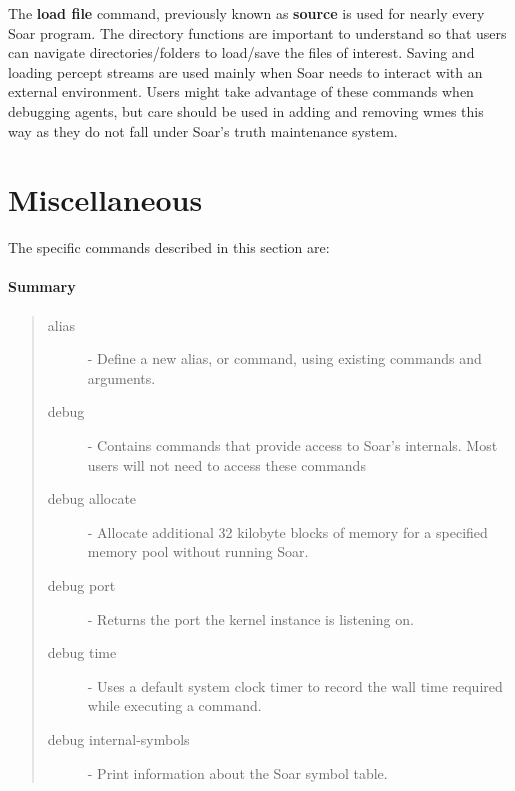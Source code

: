 The \textbf{load file} command, previously known as \textbf{source} is used for nearly every Soar program.  The
directory functions are important to understand so that users can
navigate directories/folders to load/save the files of interest.  
Saving and loading percept streams are used mainly  when Soar needs to interact with an
external environment.  Users might take advantage of these commands when
debugging agents, but care should be used in adding and removing wmes this
way as they do not fall under Soar's truth maintenance system.

\divider 


\divider 


\divider 


\divider 

\section{Miscellaneous}
\label{MISC}



The specific commands described in this section are:


\paragraph{Summary}
\begin{quote}
\begin{description}
\item[alias] - Define a new alias, or command, using existing commands and arguments.
\item[debug] - Contains commands that provide access to Soar's internals. Most users will not need to access these commands
\item[debug allocate] - Allocate additional 32 kilobyte blocks of memory for a specified memory pool without running Soar.
\item[debug port] - Returns the port the kernel instance is listening on.
\item[debug time] - Uses a default system clock timer to record the wall time required while executing a command.
\item[debug internal-symbols] - Print information about the Soar symbol table.
\end{description}
\end{quote}

\divider 


\divider 


